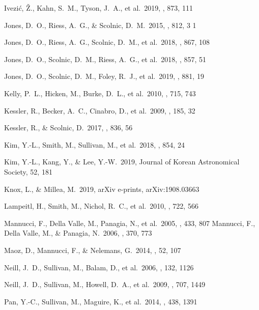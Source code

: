 \documentclass[]{aa} %
\begin{document}
\begin{thebibliography}{}
 Ivezi{\'c}, {\v{Z}}., Kahn, S.~M., Tyson, J.~A., et al.\ 2019, \apj, 873, 111


 Jones, D.~O., Riess, A.~G., \& Scolnic, D.~M.\ 2015, \apj, 812, 3
1

 Jones, D.~O., Riess, A.~G., Scolnic, D.~M., et al.\ 2018, \apj, 867, 108

 Jones, D.~O., Scolnic, D.~M., Riess, A.~G., et al.\ 2018, \apj, 857, 51

 Jones, D.~O., Scolnic, D.~M., Foley, R.~J., et al.\ 2019, \apj, 881, 19

 Kelly, P.~L., Hicken, M., Burke, D.~L., et al.\ 2010, \apj, 715, 743

 Kessler, R., Becker, A.~C., Cinabro, D., et al.\ 2009, \apjs, 185, 32

 Kessler, R., \& Scolnic, D.\ 2017, \apj, 836, 56

 Kim, Y.-L., Smith, M., Sullivan, M., et al.\ 2018, \apj, 854, 24

 Kim, Y.-L., Kang, Y., \& Lee, Y.-W.\ 2019, Journal of Korean Astronomical Society, 52, 181

 Knox, L., \& Millea, M.\ 2019, arXiv e-prints, arXiv:1908.03663

 Lampeitl, H., Smith, M., Nichol, R.~C., et al.\ 2010, \apj, 722, 566

 Mannucci, F.,
  Della Valle, M., Panagia, N., et al.\ 2005, \aap, 433, 807 
 Mannucci, F.,
  Della Valle, M., \& Panagia, N.\ 2006, \mnras, 370, 773 

 Maoz, D., Mannucci,
  F., \& Nelemans, G.\ 2014, \araa, 52, 107 


 Neill, J.~D., Sullivan, M., Balam, D., et al.\ 2006, \aj, 132, 1126

 Neill, J.~D., Sullivan, M., Howell, D.~A., et al.\ 2009, \apj, 707, 1449

 Pan, Y.-C., Sullivan, M., Maguire, K., et al.\ 2014, \mnras, 438, 1391


\end{thebibliography}
\end{document}
